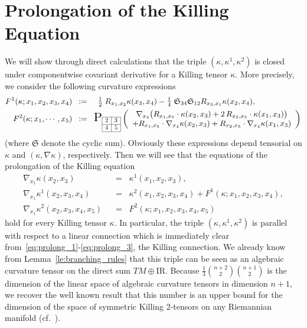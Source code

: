 \documentclass[11pt,a4paper]{article}
\theoremstyle{plain}
\theoremstyle{remark}
\newcommand{\cyclic}{\mathfrak{S}}
\newcommand{\R}{\mathrm{I\!R}}
\newcommand{\rmP}{\mathrm{P}}
\begin{document}
\section{Prolongation of the Killing Equation}\label{se:prolongation}
We will show through direct calculations that the triple  $(\kappa,\kappa^1,\kappa^2)$ is closed 
under componentwise covariant derivative for a Killing tensor $\kappa$.  More precisely, we consider the following curvature expressions
\begin{align}\label{eq:def_F21}
F^1(\kappa;x_1,x_2,x_3,x_4) &\;\;:=\;\; \begin{array}{cc}  \frac{1}{2}\; R_{x_1,x_2}\kappa(x_3,x_4) 
-  \frac{1}{4}\; \cyclic_{34}\cyclic_{12} R_{x_3,x_1}\kappa(x_2,x_4),
\end{array}\\
\label{eq:def_F22}
F^2(\kappa;x_1,\cdots,x_5) &\;\;:=\;\;\scaleto{\rmP_{\scaleto{\begin{array}{|c|c|}
\cline{1-2}
2 & 3 \\
\cline{1-2}
4  & 5 \\
\cline{1-2} 
\end{array}}{12pt}}}{24pt} \left (
\begin{array}{c}
   \nabla_{x_4}\big (R_{x_1,x_5}\cdot \kappa(x_2,x_3) + 2\, R_{x_2,x_5} \cdot \kappa(x_1,x_3)\big )\\
 + R_{x_1,x_5}\cdot \nabla_{x_4}\kappa(x_2,x_3) + R_{x_2,x_5}  \cdot \nabla_{x_4}\kappa(x_1,x_3)
\end{array}\right )
\end{align}
(where $\cyclic$ denote the cyclic sum). Obviously these expressions depend tensorial on $\kappa$ and $(\kappa,\nabla \kappa)$,
respectively. Then we will see that the equations of the prolongation of the
Killing equation
\begin{align}\label{eq:prolong_1}
\nabla_{x_1}\kappa (x_2,x_3)& \;\;=\;\; \kappa^1(x_1,x_2,x_3),\\
\label{eq:prolong_2}
\nabla_{x_1}\kappa^1(x_2,x_3,x_4) & \;\;=\;\; \kappa^2(x_1,x_2,x_3,x_4) + F^1(\kappa;x_1,x_2,x_3,x_4),\\
\label{eq:prolong_3}
\nabla_{x_1}\kappa^2(x_2,x_3,x_4,x_5) & \;\;=\;\; F^2(\kappa;x_1,x_2,x_3,x_4,x_5)
\end{align}
hold for every Killing tensor $\kappa$. In particular,
the triple $(\kappa,\kappa^1,\kappa^2)$ is parallel with respect to a linear
connection which is immediately clear
from~\eqref{eq:prolong_1}-\eqref{eq:prolong_3}, the Killing connection.
We already know from Lemma~\ref{le:branching_rules} that this triple can be seen as an algebraic curvature tensor 
on the direct sum $TM \oplus \R$. Because $\frac{1}{3}\binom{n+2}{2}\binom{n+1}{2}$  is the dimension of the linear space of algebraic curvature tensors in dimension $n+1$, we recover the well known result that this number 
is an upper bound for the dimension of the space of symmetric Killing 2-tensors on any Riemannian manifold (cf.~\cite[Theorem~4.3]{Th}).
\end{document}
